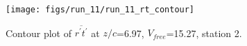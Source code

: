 \begin{figure}[H]
\centering
\texttt{[image: figs/run\_11/run\_11\_rt\_contour]}
\caption{Contour plot of $\overline{r^\prime t^\prime}$ at $z/c$=6.97, $V_{free}$=15.27, station 2.}
\label{fig:run_11_rt_contour}
\end{figure}


